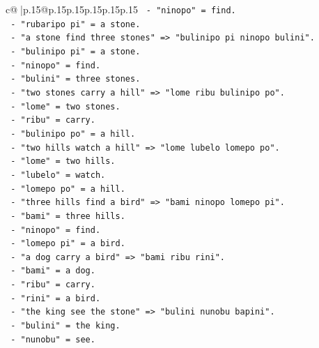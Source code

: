 \documentclass{article}
\begin{document}
{\begin{supertabular}{c@{$\;$}|p{.15\linewidth}@{}p{.15\linewidth}p{.15\linewidth}p{.15\linewidth}p{.15\linewidth}p{.15\linewidth}}
{{{\texttt{                     {-} "ninopo" = find.} \\
\texttt{                     {-} "rubaripo pi" = a stone.} \\
\texttt{                   {-} "a stone find three stones" => "bulinipo pi ninopo bulini".} \\
\texttt{                     {-} "bulinipo pi" = a stone.} \\
\texttt{                     {-} "ninopo" = find.} \\
\texttt{                     {-} "bulini" = three stones.} \\
\texttt{                   {-} "two stones carry a hill" => "lome ribu bulinipo po".} \\
\texttt{                     {-} "lome" = two stones.} \\
\texttt{                     {-} "ribu" = carry.} \\
\texttt{                     {-} "bulinipo po" = a hill.} \\
\texttt{                   {-} "two hills watch a hill" => "lome lubelo lomepo po".} \\
\texttt{                     {-} "lome" = two hills.} \\
\texttt{                     {-} "lubelo" = watch.} \\
\texttt{                     {-} "lomepo po" = a hill.} \\
\texttt{                   {-} "three hills find a bird" => "bami ninopo lomepo pi".} \\
\texttt{                     {-} "bami" = three hills.} \\
\texttt{                     {-} "ninopo" = find.} \\
\texttt{                     {-} "lomepo pi" = a bird.} \\
\texttt{                   {-} "a dog carry a bird" => "bami ribu rini".} \\
\texttt{                     {-} "bami" = a dog.} \\
\texttt{                     {-} "ribu" = carry.} \\
\texttt{                     {-} "rini" = a bird.} \\
\texttt{                   {-} "the king see the stone" => "bulini nunobu bapini".} \\
\texttt{                     {-} "bulini" = the king.} \\
\texttt{                     {-} "nunobu" = see.} \\
}}}
\end{supertabular}}
\end{document}
